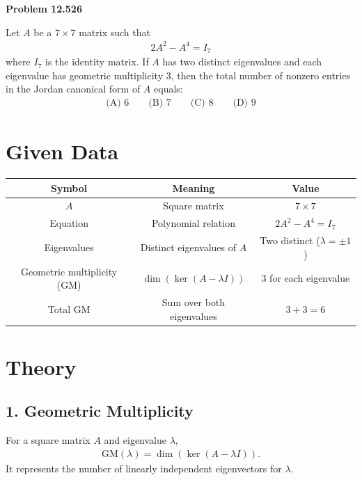 \documentclass[12pt]{article}
\begin{document}
\textbf{Problem 12.526}

Let $A$ be a $7\times7$ matrix such that 
\begin{align}
2A^2 - A^4 = I_7
\end{align}
where $I_7$ is the identity matrix. If $A$ has two distinct eigenvalues and each eigenvalue has geometric multiplicity $3$, then the total number of nonzero entries in the Jordan canonical form of $A$ equals:
\begin{align*}
\text{(A) } 6 \qquad \text{(B) } 7 \qquad \text{(C) } 8 \qquad \text{(D) } 9
\end{align*}

\vspace{1em}

\section*{Given Data}

\begin{table}[H]
\centering
\renewcommand{\arraystretch}{1.4}
\begin{tabular}{|c|c|c|}
\hline
\textbf{Symbol} & \textbf{Meaning} & \textbf{Value} \\
\hline
$A$ & Square matrix & $7\times7$ \\
\hline
Equation & Polynomial relation & $2A^2 - A^4 = I_7$ \\
\hline
Eigenvalues & Distinct eigenvalues of $A$ & Two distinct ($\lambda = \pm1$) \\
\hline
Geometric multiplicity (GM) & $\dim(\ker(A-\lambda I))$ & $3$ for each eigenvalue \\
\hline
Total GM & Sum over both eigenvalues & $3 + 3 = 6$ \\
\hline
\end{tabular}
\end{table}

\vspace{1em}

\section*{Theory}

\subsection*{1. Geometric Multiplicity}

For a square matrix $A$ and eigenvalue $\lambda$,
\begin{align}
\text{GM}(\lambda) = \dim(\ker(A - \lambda I)).
\end{align}
It represents the number of linearly independent eigenvectors for $\lambda$.  
\end{document}
